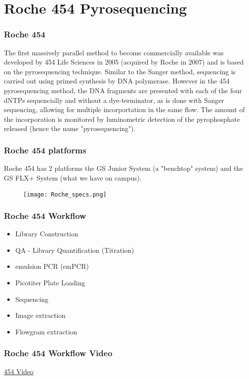 \documentclass{beamer}
\begin{document}
\section{Roche 454 Pyrosequencing}

\begin{frame}
  \frametitle{Roche 454}
  The first massively parallel method to become commercially available was developed by 454 Life Sciences in 2005 (acquired by Roche in 2007) and is based on the pyrosequencing technique. Similar to the Sanger method, sequencing is carried out using primed synthesis by DNA polymerase. However in the 454 pyrosequencing method, the DNA fragments are presented with each of the four dNTPs sequencially and without a dye-terminator, as is done with Sanger sequencing, allowing for multiple incorportation in the same flow. The amount of the incorporation is monitored by luminometric detection of the pyrophosphate released (hence the name "pyrosequencing").
\end{frame}

\begin{frame}
  \frametitle{Roche 454 platforms}
  Roche 454 has 2 platforms the GS Junior System (a "benchtop" system) and the GS FLX+ System (what we have on campus).
  \begin{center}
    \begin{figure}
    \texttt{[image: Roche\_specs.png]}
  \end{figure}
  \end{center}
\end{frame}

\begin{frame}
  \frametitle{Roche 454 Workflow}
  \begin{itemize}
  \item Library Construction
  \item QA - Library Quantification (Titration)
  \item emulsion PCR (emPCR)
  \item Picotiter Plate Loading
  \item Sequencing
  \item Image extraction
  \item Flowgram extraction
  \end{itemize}
\end{frame}


\begin{frame}
  \frametitle{Roche 454 Workflow Video}
  \begin{center}
  \href{http://www.youtube.com/watch?feature=player_detailpage&v=bFNjxKHP8Jc}{454 Video}
  \end{center}  
\end{frame}
\end{document}

